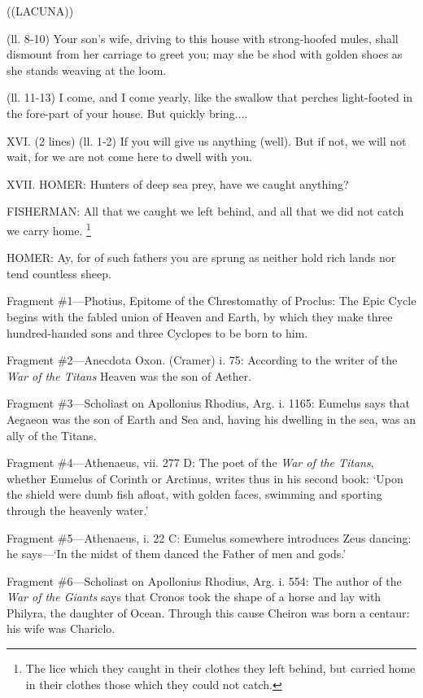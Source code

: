 ((LACUNA))

(ll. 8-10) Your son’s wife, driving to this house with strong-hoofed
mules, shall dismount from her carriage to greet you; may she be shod with
golden shoes as she stands weaving at the loom.

(ll. 11-13) I come, and I come yearly, like the swallow that perches
light-footed in the fore-part of your house. But quickly bring....

XVI. (2 lines) (ll. 1-2) If you will give us anything (well). But if not, we
will not wait, for we are not come here to dwell with you.

XVII. HOMER: Hunters of deep sea prey, have we caught anything?

FISHERMAN: All that we caught we left behind, and all that we did not catch we
carry home. \footnote{The lice which they caught
in their clothes they left behind, but carried home in their clothes those
which they could not catch.}

HOMER: Ay, for of such fathers you are sprung as neither hold rich lands nor
tend countless sheep.



Fragment \#1—Photius, Epitome of the Chrestomathy of Proclus: The Epic
Cycle begins with the fabled union of Heaven and Earth, by which they make
three hundred-handed sons and three Cyclopes to be born to him.

Fragment \#2—Anecdota Oxon. (Cramer) i. 75: According to the writer of the
\emph{War of the Titans} Heaven was the son of Aether.

Fragment \#3—Scholiast on Apollonius Rhodius, Arg. i. 1165: Eumelus says
that Aegaeon was the son of Earth and Sea and, having his dwelling in the sea,
was an ally of the Titans.

Fragment \#4—Athenaeus, vii. 277 D: The poet of the \emph{War of the
Titans}, whether Eumelus of Corinth or Arctinus, writes thus in his
second book: ‘Upon the shield were dumb fish afloat, with golden faces,
swimming and sporting through the heavenly water.’

Fragment \#5—Athenaeus, i. 22 C: Eumelus somewhere introduces Zeus
dancing: he says—‘In the midst of them danced the Father of men and
gods.’

Fragment \#6—Scholiast on Apollonius Rhodius, Arg. i. 554: The author of
the \emph{War of the Giants} says that Cronos took the shape of a horse
and lay with Philyra, the daughter of Ocean. Through this cause Cheiron was
born a centaur: his wife was Chariclo.

